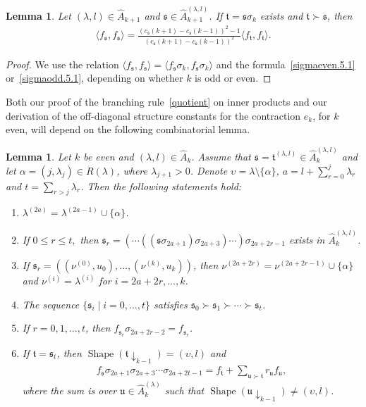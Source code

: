 \documentclass[11pt,a4paper,reqno,svgnames]{amsart}
\theoremstyle{plain}
\newtheorem{lemma}[theorem]{Lemma}
\theoremstyle{definition}
\numberwithin{equation}{section}
\begin{document}
\begin{lemma}\label{observation:2}
Let $(\lambda,l)\in\hat{A}_{k+1}$ and  $\mathfrak{s}\in\hat{A}_{k+1}^{(\lambda,l)}$. If $\mathfrak{t}=\mathfrak{s}\sigma_{k}$ exists and $\mathfrak{t}\succ\mathfrak{s}$, then
\begin{align*}
\langle f_\mathfrak{s},f_\mathfrak{s}\rangle = \frac{(c_\mathfrak{s}(k+1)-c_\mathfrak{s}(k-1))^2-1}{(c_\mathfrak{s}(k+1)-c_\mathfrak{s}(k-1))^2}\langle f_\mathfrak{t},f_\mathfrak{t}\rangle. 
\end{align*}
\end{lemma}
\begin{proof}
We use the relation $\langle f_\mathfrak{s},f_\mathfrak{s}\rangle =\langle f_\mathfrak{s}\sigma_k,f_\mathfrak{s}\sigma_k\rangle$ and the formula~\eqref{sigmaeven.5.1} or~\eqref{sigmaodd.5.1}, depending on whether $k$ is odd or even. 
\end{proof}
Both our proof of the branching rule~\eqref{quotient} on inner products and our derivation of the off-diagonal structure constants for the contraction $e_k$, for $k$ even, will depend on the following combinatorial lemma. 
\begin{lemma}\label{obs:5}
Let $k$ be even and $(\lambda,l)\in\hat{A}_{k}$. Assume that $\mathfrak{s}=\mathfrak{t}^{(\lambda,l)}\in\hat{A}_{k}^{(\lambda,l)}$ and  let $\alpha=(j,\lambda_j)\in R(\lambda)$, where $\lambda_{j+1}>0$. Denote $\upsilon=\lambda\setminus\lbrace \alpha\rbrace$,  $a=l+\sum_{r=0}^j\lambda_r$ and $t=\sum_{r>j}\lambda_r$. Then the following statements hold:
\begin{enumerate}
[label=(\arabic{*}), ref=\arabic{*},leftmargin=0pt,itemindent=1.5em]
\item\label{obs:5.1} $\lambda^{(2a)}=\lambda^{(2a-1)}\cup\lbrace \alpha\rbrace$.
\item\label{obs:5.2} If $0{\leqslant} r{\leqslant} t,$ then $\mathfrak{s}_r=(\cdots ((\mathfrak{s}\sigma_{2a+1})\sigma_{2a+3})\cdots)\sigma_{2a+2r-1}$ exists in $\hat{A}_k^{(\lambda,l)}$.
\item\label{obs:5.3} If $\mathfrak{s}_r=((\nu^{(0)},u_0),\ldots,(\nu^{(k)},u_k))$, then $\nu^{(2a+2r)}=\nu^{(2a+2r-1)}\cup\lbrace \alpha\rbrace$ and $\nu^{(i)}=\lambda^{(i)}$ for $i=2a+2r,\ldots ,k$.
\item\label{obs:5.4} The sequence $\lbrace \mathfrak{s}_i\mid i=0,\ldots,t\rbrace $ satisfies $\mathfrak{s}_0\succ\mathfrak{s}_1\succ\cdots\succ\mathfrak{s}_{t}$. 
\item\label{obs:5.5} If $r=0,1,\ldots,t$, then $f_{\mathfrak{s}_r}\sigma_{2a+2r-2}=f_{\mathfrak{s}_r}$. 
\item\label{obs:5.6} If $\mathfrak{t}=\mathfrak{s}_{t}$,  then $\operatorname{Shape}(\mathfrak{t}\downarrow_{k-1})=(\upsilon,l)$ and 
\begin{align}\label{expansion}
f_\mathfrak{s} \sigma_{2a+1}\sigma_{2a+3}\cdots \sigma_{2a+2t-1}=f_\mathfrak{t}+\sum_{\mathfrak{u}\succ\mathfrak{t}}r_\mathfrak{u}f_\mathfrak{u},
\end{align}
where the sum is over $\mathfrak{u}\in\hat{A}_{k}^{(\lambda)}$ such that $\operatorname{Shape}(\mathfrak{u}\downarrow_{k-1})\ne (\upsilon,l)$. 
\end{enumerate}
\end{lemma}
\end{document}
